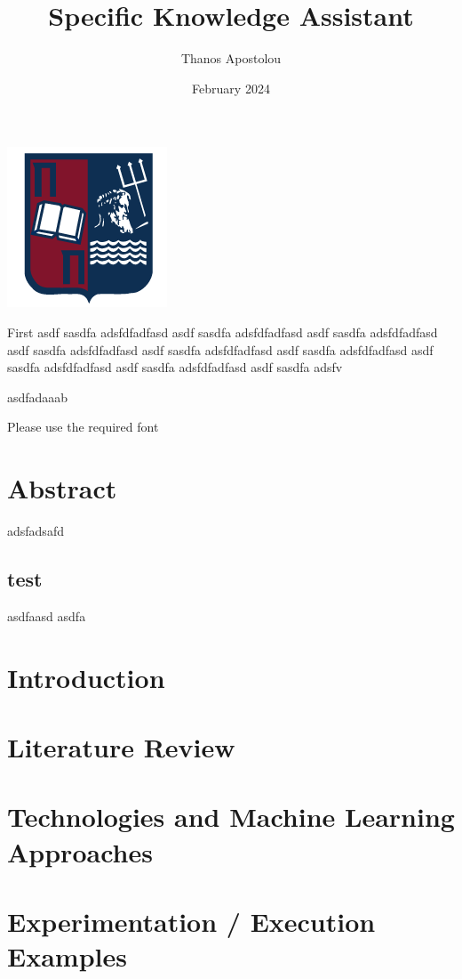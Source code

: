\documentclass[10pt,a4paper]{report}
\title{Specific Knowledge Assistant}
\author{Thanos Apostolou}
\date{February 2024}
\begin{document}
\begin{center}
	\includegraphics[scale=0.5]{unipi.png}
\end{center}

\noindent
First asdf sasdfa adsfdfadfasd asdf sasdfa adsfdfadfasd asdf sasdfa adsfdfadfasd asdf sasdfa adsfdfadfasd asdf sasdfa adsfdfadfasd asdf sasdfa adsfdfadfasd asdf sasdfa adsfdfadfasd asdf sasdfa adsfdfadfasd asdf sasdfa adsfv

asdfadaaab

{\selectfont Please use the required font}



\newpage
\tableofcontents

\newpage
\chapter{Abstract}
adsfadsafd
\section{test}
asdfaasd
asdfa

\newpage
\chapter{Introduction}

\newpage
\chapter{Literature Review}

\newpage
\chapter{Technologies and Machine Learning Approaches}

\newpage
\chapter{Experimentation / Execution Examples}
\end{document}
